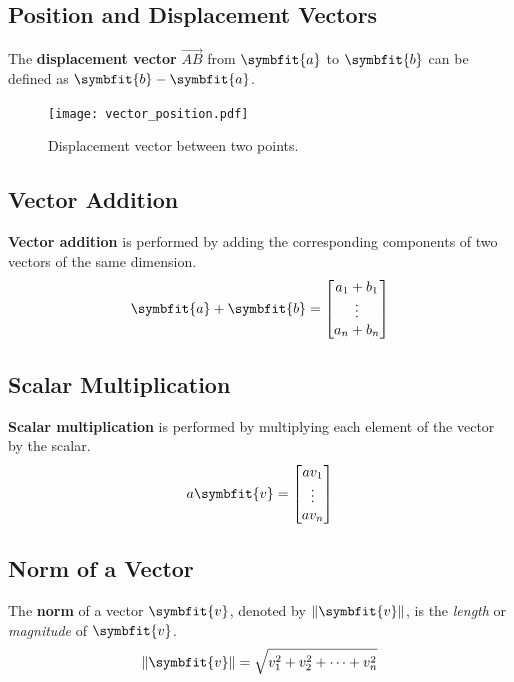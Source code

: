 \documentclass{article}
\begin{document}
\subsection{Position and Displacement Vectors}
\begin{definition}
    The \textbf{displacement vector} \(\overrightarrow{AB}\) from
    \(\symbfit{a}\) to \(\symbfit{b}\) can be defined as
    \(\symbfit{b}-\symbfit{a}\).
    \begin{figure}[H]
        \centering
        \texttt{[image: vector\_position.pdf]}
        \caption{Displacement vector between two points.}
    \end{figure}
\end{definition}
\subsection{Vector Addition}
\begin{definition}
    \textbf{Vector addition} is performed by adding the corresponding
    components of two vectors of the same dimension.
    \begin{equation*}
        \symbfit{a} + \symbfit{b} =
        \begin{bmatrix}
            a_1+b_1 \\
            \vdots  \\
            a_n+b_n
        \end{bmatrix}
    \end{equation*}
\end{definition}
\subsection{Scalar Multiplication}
\begin{definition}
    \textbf{Scalar multiplication} is performed by multiplying each
    element of the vector by the scalar.
    \begin{equation*}
        a\symbfit{v} =
        \begin{bmatrix}
            av_1   \\
            \vdots \\
            av_n
        \end{bmatrix}
    \end{equation*}
\end{definition}
\subsection{Norm of a Vector}
\begin{definition}
    The \textbf{norm} of a vector \(\symbfit{v}\), denoted by
    \(\norm{\symbfit{v}}\), is the \textit{length} or \textit{magnitude}
    of \(\symbfit{v}\).
    \begin{equation*}
        \norm{\symbfit{v}} = \sqrt{v_1^2 + v_2^2+\cdots+v_n^2}
    \end{equation*}
\end{definition}
\end{document}
